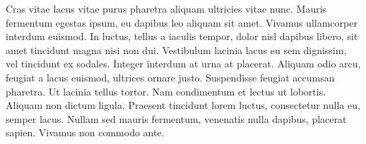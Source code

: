 \documentclass{article}
\begin{document}
{{ Cras vitae lacus vitae purus pharetra aliquam ultricies vitae nunc.
 Mauris fermentum egestas ipsum, eu dapibus leo aliquam sit amet.
 Vivamus ullamcorper interdum euismod.
 In luctus, tellus a iaculis tempor, dolor nisl dapibus libero, sit amet tincidunt magna nisi non dui.
 Vestibulum lacinia lacus eu sem dignissim, vel tincidunt ex sodales.
 Integer interdum at urna at placerat.
 Aliquam odio arcu, feugiat a lacus euismod, ultrices ornare justo.
 Suspendisse feugiat accumsan pharetra.
 Ut lacinia tellus tortor.
 Nam condimentum et lectus ut lobortis.
 Aliquam non dictum ligula.
 Praesent tincidunt lorem luctus, consectetur nulla eu, semper lacus.
 Nullam sed mauris fermentum, venenatis nulla dapibus, placerat sapien.
 Vivamus non commodo ante.
}}

\pend
\endnumbering
\end{document}
